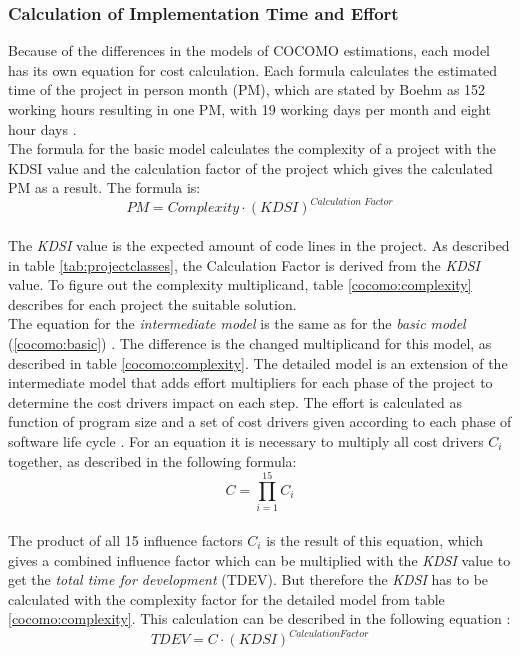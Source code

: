 \subsubsection{Calculation of Implementation Time and Effort}

Because of the differences in the models of COCOMO estimations, each model has its own equation for cost calculation. Each formula calculates the estimated time of the project in person month (PM), which are stated by Boehm as 152 working hours resulting in one PM, with 19 working days per month and eight hour days \cite{boehm}. \\
The formula for the basic model calculates the complexity of a project with the KDSI value and the calculation factor of the project which gives the calculated PM as a result. The formula is:\\
\begin{equation}
\textit{PM} = \textit{Complexity} \cdot (\textit{KDSI})^{\textit{Calculation Factor}} \label{cocomo:basic}
\end{equation}\\
The \textit{KDSI} value is the expected amount of code lines in the project. As described in table \ref{tab:projectclasses}, the Calculation Factor is derived from the \textit{KDSI} value. To figure out the complexity multiplicand, table \ref{cocomo:complexity} describes for each project the suitable solution.\\
The equation for the \textit{intermediate model} is the same as for the \textit{basic model} (\ref{cocomo:basic}) \cite{boehm}. The difference is the changed multiplicand for this model, as described in table \ref{cocomo:complexity}. The detailed model is an extension of the intermediate model that adds effort multipliers for each phase of the project to determine the cost drivers impact on each step. The effort is calculated as function of program size and a set of cost drivers given according to each phase of software life cycle \cite{boehm}. For an equation it is necessary to multiply all cost drivers \textbf{\(C_i\)} together, as described in the following formula:\\
\begin{equation}
C = \prod \limits_{i=1}^{15} C_i \label{cocomo:detailedcostdrivers}
\end{equation}\\
The product of all 15 influence factors $C_i$ is the result of this equation, which 
gives a combined influence factor which can be multiplied with the \textit{KDSI} value to get the \textit{total time for development} (TDEV). But therefore the \textit{KDSI} has to be calculated with the complexity factor for the detailed model from table \ref{cocomo:complexity}. This calculation can be described in the following equation \cite{boehm}:\\
\begin{equation}
TDEV = C \cdot (KDSI)^{Calculation Factor} \label{cocomo:detailed}
\end{equation}\\

